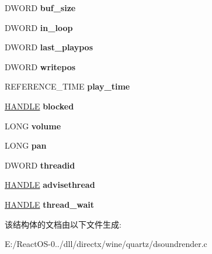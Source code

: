 \begin{DoxyCompactItemize}
D\+W\+O\+RD {\bfseries buf\+\_\+size}
\item 
\mbox{\label{struct_d_sound_render_impl_ad2c59fdfba9f4f516fbfa46cc4dfcd60}} 
D\+W\+O\+RD {\bfseries in\+\_\+loop}
\item 
\mbox{\label{struct_d_sound_render_impl_a8a6fea4e94bae2424d72e840464990a2}} 
D\+W\+O\+RD {\bfseries last\+\_\+playpos}
\item 
\mbox{\label{struct_d_sound_render_impl_ab1b4567d7bb44e5dd94a95d4e3c0fc4d}} 
D\+W\+O\+RD {\bfseries writepos}
\item 
\mbox{\label{struct_d_sound_render_impl_af00370bc460a9bf594cc87245a21dbf1}} 
R\+E\+F\+E\+R\+E\+N\+C\+E\+\_\+\+T\+I\+ME {\bfseries play\+\_\+time}
\item 
\mbox{\label{struct_d_sound_render_impl_ac6e9e0a2f88a454c7ac2103f69f6a5e1}} 
\hyperlink{interfacevoid}{H\+A\+N\+D\+LE} {\bfseries blocked}
\item 
\mbox{\label{struct_d_sound_render_impl_a81baeee23c2119a20656e23bdb23b18c}} 
L\+O\+NG {\bfseries volume}
\item 
\mbox{\label{struct_d_sound_render_impl_a14c5300754a2fa598ae9622690bc94ce}} 
L\+O\+NG {\bfseries pan}
\item 
\mbox{\label{struct_d_sound_render_impl_a8a2e4bff45f2c76abcbd8fdedafc68c0}} 
D\+W\+O\+RD {\bfseries threadid}
\item 
\mbox{\label{struct_d_sound_render_impl_a08ef64fa1e5fbfb987c852bca885cc71}} 
\hyperlink{interfacevoid}{H\+A\+N\+D\+LE} {\bfseries advisethread}
\item 
\mbox{\label{struct_d_sound_render_impl_a729ea2922c494db0480d7139a530f291}} 
\hyperlink{interfacevoid}{H\+A\+N\+D\+LE} {\bfseries thread\+\_\+wait}
\end{DoxyCompactItemize}


该结构体的文档由以下文件生成\+:\begin{DoxyCompactItemize}
\item 
E\+:/\+React\+O\+S-\/0../dll/directx/wine/quartz/dsoundrender.\+c\end{DoxyCompactItemize}
